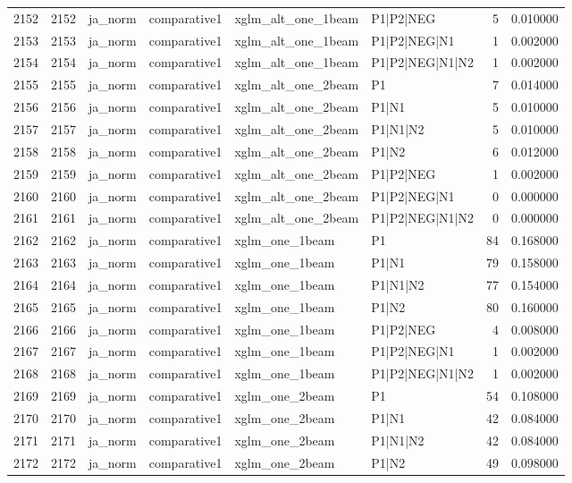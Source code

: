 \begin{tabular}{lrllllrr}
2152 & 2152 & ja_norm & comparative1 & xglm_alt_one_1beam & P1|P2|NEG & 5 & 0.010000 \\
2153 & 2153 & ja_norm & comparative1 & xglm_alt_one_1beam & P1|P2|NEG|N1 & 1 & 0.002000 \\
2154 & 2154 & ja_norm & comparative1 & xglm_alt_one_1beam & P1|P2|NEG|N1|N2 & 1 & 0.002000 \\
2155 & 2155 & ja_norm & comparative1 & xglm_alt_one_2beam & P1 & 7 & 0.014000 \\
2156 & 2156 & ja_norm & comparative1 & xglm_alt_one_2beam & P1|N1 & 5 & 0.010000 \\
2157 & 2157 & ja_norm & comparative1 & xglm_alt_one_2beam & P1|N1|N2 & 5 & 0.010000 \\
2158 & 2158 & ja_norm & comparative1 & xglm_alt_one_2beam & P1|N2 & 6 & 0.012000 \\
2159 & 2159 & ja_norm & comparative1 & xglm_alt_one_2beam & P1|P2|NEG & 1 & 0.002000 \\
2160 & 2160 & ja_norm & comparative1 & xglm_alt_one_2beam & P1|P2|NEG|N1 & 0 & 0.000000 \\
2161 & 2161 & ja_norm & comparative1 & xglm_alt_one_2beam & P1|P2|NEG|N1|N2 & 0 & 0.000000 \\
2162 & 2162 & ja_norm & comparative1 & xglm_one_1beam & P1 & 84 & 0.168000 \\
2163 & 2163 & ja_norm & comparative1 & xglm_one_1beam & P1|N1 & 79 & 0.158000 \\
2164 & 2164 & ja_norm & comparative1 & xglm_one_1beam & P1|N1|N2 & 77 & 0.154000 \\
2165 & 2165 & ja_norm & comparative1 & xglm_one_1beam & P1|N2 & 80 & 0.160000 \\
2166 & 2166 & ja_norm & comparative1 & xglm_one_1beam & P1|P2|NEG & 4 & 0.008000 \\
2167 & 2167 & ja_norm & comparative1 & xglm_one_1beam & P1|P2|NEG|N1 & 1 & 0.002000 \\
2168 & 2168 & ja_norm & comparative1 & xglm_one_1beam & P1|P2|NEG|N1|N2 & 1 & 0.002000 \\
2169 & 2169 & ja_norm & comparative1 & xglm_one_2beam & P1 & 54 & 0.108000 \\
2170 & 2170 & ja_norm & comparative1 & xglm_one_2beam & P1|N1 & 42 & 0.084000 \\
2171 & 2171 & ja_norm & comparative1 & xglm_one_2beam & P1|N1|N2 & 42 & 0.084000 \\
2172 & 2172 & ja_norm & comparative1 & xglm_one_2beam & P1|N2 & 49 & 0.098000 \\

\end{tabular}
